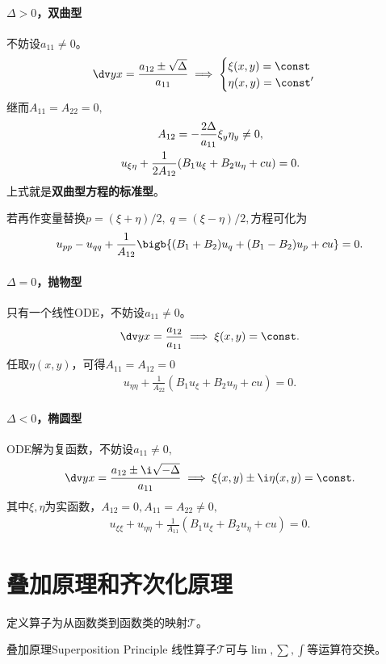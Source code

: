 \paragraph{$\Delta>0$，双曲型}不妨设$a_{11}\neq 0$。
\begin{align}
	\dv yx=\frac{a_{12}\pm\sqrt\Delta}{a_{11}}\implies
	\begin{cases}
		\xi(x,y)=\const \\
		\eta(x,y)=\const'
	\end{cases}
\end{align}
继而$A_{11}=A_{22}=0,$
\begin{gather}\notag
	A_{12}=-\frac{2\Delta}{a_{11}}\xi_y\eta_y\neq 0,\\
	u_{\xi\eta}+\frac1{2A_{12}}(B_1u_\xi+B_2u_\eta+cu)=0.
\end{gather}
上式就是\textbf{双曲型方程的标准型}。

若再作变量替换$p=(\xi+\eta)/2,\;q=(\xi-\eta)/2,$方程可化为
\begin{align}
	u_{pp}-u_{qq}+\frac1{A_{12}}\bigb{(B_1+B_2)u_q+(B_1-B_2)u_p+cu}=0.
\end{align}
\paragraph{$\Delta=0$，抛物型}只有一个线性ODE，不妨设$a_{11}\neq 0$。
\begin{align}
	\dv yx=\frac{a_{12}}{a_{11}}\implies\xi(x,y)=\const.
\end{align}
任取$\eta(x,y)$，可得$A_{11}=A_{12}=0$
\begin{align}
	u_{\eta\eta}+\frac1{A_{22}}(B_1u_\xi+B_2u_\eta+cu)=0.
\end{align}
\paragraph{$\Delta<0$，椭圆型}ODE解为复函数，不妨设$a_{11}\neq 0,$
\begin{align}
	\dv yx=\frac{a_{12}\pm\i\sqrt{-\Delta}}{a_{11}}\implies \xi(x,y)\pm\i\eta(x,y)=\const.
\end{align}
其中$\xi,\eta$为实函数，$A_{12}=0,A_{11}=A_{22}\neq 0,$
\begin{align}
	u_{\xi\xi}+u_{\eta\eta}+\frac1{A_{11}}(B_1u_\xi+B_2u_\eta+cu)=0.
\end{align}
\section{叠加原理和齐次化原理}
定义算子为从函数类到函数类的映射$\mathcal T$。
\begin{theorem}{叠加原理}{Superposition Principle}
	线性算子$\mathcal T$可与$\textstyle\lim,\sum,\int$等运算符交换。%
\end{theorem}

